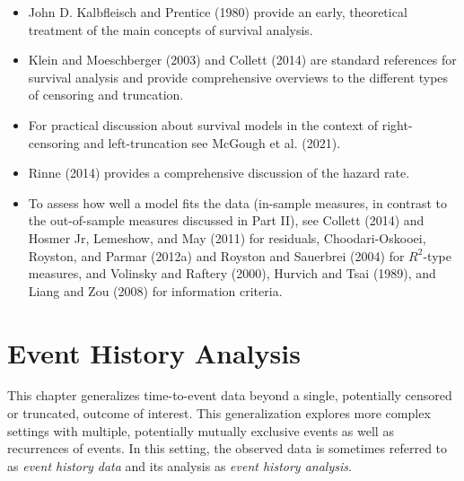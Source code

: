 \documentclass[
  letterpaper,
  krantz2]{style/krantz}
\providecommand{\tightlist}{%
  \setlength{\itemsep}{0pt}\setlength{\parskip}{0pt}}
\begin{document}
\begin{tcolorbox}[enhanced jigsaw, toprule=.15mm, bottomtitle=1mm, opacityback=0, breakable, leftrule=.75mm, title={Further reading}, toptitle=1mm, bottomrule=.15mm, colback=white, colframe=quarto-callout-tip-color-frame, titlerule=0mm, opacitybacktitle=0.6, coltitle=black, rightrule=.15mm, left=2mm, colbacktitle=quarto-callout-tip-color!10!white, arc=.35mm]

\begin{itemize}
\tightlist
\item
  John D. Kalbfleisch and Prentice (1980) provide an early, theoretical
  treatment of the main concepts of survival analysis.
\item
  Klein and Moeschberger (2003) and Collett (2014) are standard
  references for survival analysis and provide comprehensive overviews
  to the different types of censoring and truncation.
\item
  For practical discussion about survival models in the context of
  right-censoring and left-truncation see McGough et al. (2021).
\item
  Rinne (2014) provides a comprehensive discussion of the hazard rate.
\item
  To assess how well a model fits the data
  (in-sample measures, in contrast to the
  out-of-sample measures discussed in Part II), see Collett (2014) and
  Hosmer Jr, Lemeshow, and May (2011) for residuals,
  Choodari-Oskooei, Royston, and Parmar (2012a) and Royston and
  Sauerbrei (2004) for \(R^2\)-type measures, and
  Volinsky and Raftery (2000), Hurvich and Tsai (1989), and Liang and
  Zou (2008) for information criteria.
\end{itemize}

\end{tcolorbox}

\chapter{Event History Analysis}\label{sec-eha}

This chapter generalizes time-to-event data beyond a single, potentially
censored or truncated, outcome of interest. This generalization explores
more complex settings with multiple, potentially mutually exclusive
events as well as recurrences of events. In this setting, the observed
data is sometimes referred to as \emph{event history data} and its
analysis as \emph{event history analysis}.
\end{document}
